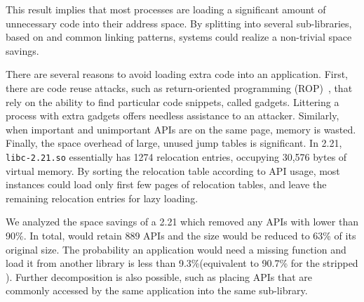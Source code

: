 This result implies that most processes are loading a significant amount of 
unnecessary code into their address space.
By splitting \libc{} into several sub-libraries, based on \usagemetric{}
and common linking patterns, systems could realize a non-trivial space savings.

There are several reasons to avoid loading extra code into an application.
First, there are code reuse attacks, such as return-oriented programming (ROP)~\citep{return-oriented},
that rely on the ability to find particular code snippets, called gadgets.
Littering a process with extra gadgets offers needless assistance to an attacker.
Similarly, when important and unimportant APIs are on the same page,
memory is wasted.  
Finally, the space overhead of large, unused jump tables is significant.
In \glibc{} 2.21, {\tt libc-2.21.so} essentially has 1274 relocation entries, occupying 30,576 bytes of virtual memory. 
By sorting the relocation table according to API usage,
most \libc{} instances could load only first few pages of relocation tables, and leave the remaining relocation entries for lazy loading.

We analyzed the space savings of a 
\glibc{} 2.21 which removed any APIs with \usagemetric{} lower than 90\%.
In total, \libc{} would retain 889 APIs
and the size would be reduced to 63\% of its original size.
The probability an application would need a missing function and load it from another library is less than 9.3\%(equivalent to 90.7\% \compatmetric{} for the stripped \libc{}).
Further decomposition is also possible, 
such as placing APIs
that are commonly accessed by the same application into the same sub-library.



